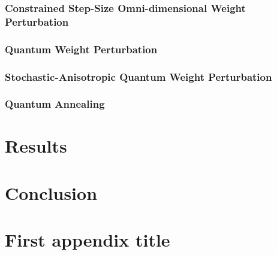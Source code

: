 \documentclass[11pt]{afthesis}
\begin{document}
	\subsection{Constrained Step-Size Omni-dimensional Weight Perturbation}
	
	\subsection{Quantum Weight Perturbation}
	
	
	
	
	\subsection{Stochastic-Anisotropic Quantum Weight Perturbation}
	
	
	
	\subsection{Quantum Annealing}
	
	
	
	
	
	
	\chapter{Results}
	
	\chapter{Conclusion}
	
	
	\appendix		%
	
	\chapter{First appendix title}
	
\end{document}
